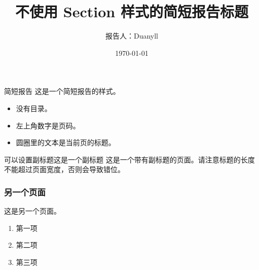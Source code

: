 \documentclass[aspectratio=169]{ctexbeamer}
\title[简短报告]{不使用 Section 样式的简短报告标题}
\author[Duanyll]{报告人：Duanyll}
\date[\today]{\today}
\begin{document}
\begin{frame}
  \titlepage
\end{frame}

\begin{frame}{简短报告}
  这是一个简短报告的样式。
  \begin{itemize}
    \item 没有目录。
    \item 左上角数字是页码。
    \item 圆圈里的文本是当前页的标题。
  \end{itemize}
\end{frame}

\begin{frame}{可以设置副标题}{这是一个副标题}
  这是一个带有副标题的页面。请注意标题的长度不能超过页面宽度，否则会导致错位。
\end{frame}

\begin{frame}
    \frametitle{另一个页面}
    这是另一个页面。
    \begin{enumerate}
        \item 第一项
        \item 第二项
        \item 第三项
    \end{enumerate}
\end{frame}
\end{document}
